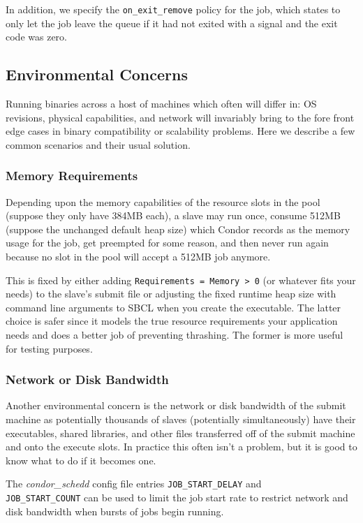 \documentclass[titlepage,12pt]{book}
\newcommand{\sbcl}{SBCL\xspace}
\begin{document}
In addition, we specify the \texttt{on\_exit\_remove} policy for the
job, which states to only let the job leave the queue if it had not
exited with a signal and the exit code was zero.

\subsection{Environmental Concerns}

Running binaries across a host of machines which often will differ in:
OS revisions, physical capabilities, and network will invariably bring
to the fore front edge cases in binary compatibility or scalability
problems. Here we describe a few common scenarios and their usual
solution.

\subsubsection{Memory Requirements}

Depending upon the memory capabilities of the resource slots in
the pool (suppose they only have 384MB each), a slave may run once,
consume 512MB (suppose the unchanged default heap size) which Condor
records as the memory usage for the job, get preempted for some reason,
and then never run again because no slot in the pool will accept a
512MB job anymore.

This is fixed by either adding \texttt{Requirements = Memory > 0}
(or whatever fits your needs) to the slave's submit file or adjusting
the fixed runtime heap size with command line arguments to \sbcl
when you create the executable. The latter choice is safer since it
models the true resource requirements your application needs and does
a better job of preventing thrashing. The former is more useful for
testing purposes.

\subsubsection{Network or Disk Bandwidth}

Another environmental concern is the network or disk bandwidth of
the submit machine as potentially thousands of slaves (potentially
simultaneously) have their executables, shared libraries, and other
files transferred off of the submit machine and onto the execute slots.
In practice this often isn't a problem, but it is good to know what
to do if it becomes one.

The \textit{condor\_schedd} config file entries
\texttt{JOB\_START\_DELAY} and\\ \texttt{JOB\_START\_COUNT} can be used
to limit the job start rate to restrict network and disk bandwidth
when bursts of jobs begin running.
\end{document}
